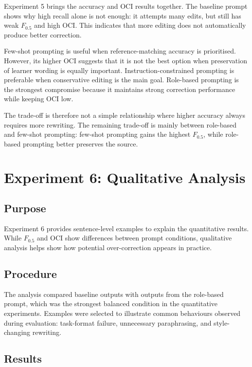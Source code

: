 Experiment 5 brings the accuracy and OCI results together. The baseline prompt shows why high recall alone is not enough: it attempts many edits, but still has weak $F_{0.5}$ and high OCI. This indicates that more editing does not automatically produce better correction.

Few-shot prompting is useful when reference-matching accuracy is prioritised. However, its higher OCI suggests that it is not the best option when preservation of learner wording is equally important. Instruction-constrained prompting is preferable when conservative editing is the main goal. Role-based prompting is the strongest compromise because it maintains strong correction performance while keeping OCI low.

The trade-off is therefore not a simple relationship where higher accuracy always requires more rewriting. The remaining trade-off is mainly between role-based and few-shot prompting: few-shot prompting gains the highest $F_{0.5}$, while role-based prompting better preserves the source.

\section{Experiment 6: Qualitative Analysis}

\subsection{Purpose}

Experiment 6 provides sentence-level examples to explain the quantitative results. While $F_{0.5}$ and OCI show differences between prompt conditions, qualitative analysis helps show how potential over-correction appears in practice.

\subsection{Procedure}

The analysis compared baseline outputs with outputs from the role-based prompt, which was the strongest balanced condition in the quantitative experiments. Examples were selected to illustrate common behaviours observed during evaluation: task-format failure, unnecessary paraphrasing, and style-changing rewriting.

\subsection{Results}

